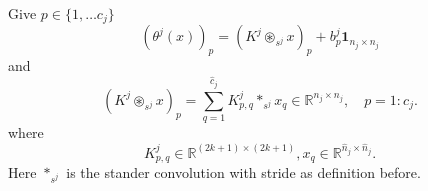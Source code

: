 Give $p\in \{1,\ldots c_j\}$
\begin{equation}
(\theta^j(x))_p= (K^j \circledast_{s^j} x)_p+b^j_p{\bm 1}_{n_j\times n_j}
\end{equation}
and
\begin{equation}
 (K^j \circledast_{s^j} x)_p
= \sum_{q=1}^{\hat c_{j}} K^{j}_{p,q} \ast_{s^j} x_q \in \mathbb{R}^{n_j \times n_j}, \quad p= 1:c_j.
\end{equation}
where
$$
K^{j}_{p,q}\in \mathbb R^{(2k+1)\times (2k+1)}, x_q\in \mathbb
R^{\hat n_{j}\times \hat n_{j}}.
$$
Here $\ast_{s^j}$ is the stander convolution with stride as definition before.
